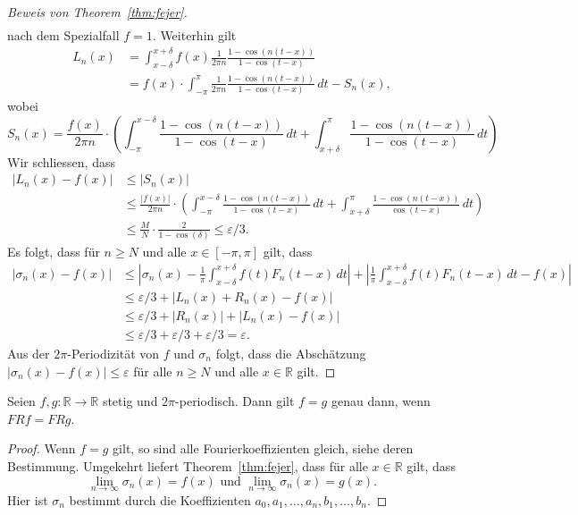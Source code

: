 \documentclass[../main.tex]{subfiles}
\begin{document}
\begin{proof}[Beweis von Theorem~\ref{thm:fejer}]
\begin{align*}
  \end{align*}
  nach dem Spezialfall $f = 1$.
  Weiterhin gilt
  \begin{align*}
    L_n(x) 
    &= \int_{x - \delta}^{x + \delta}f(x) \frac{1}{2 \pi n}
    \frac{1 - \cos(n(t-x))}{1 - \cos(t-x)}\\
    &= f(x) \cdot \int_{-\pi}^{\pi} \frac{1}{2 \pi n} \frac{1 - \cos(n(t-x))}{1 - \cos(t-x)} \, dt
    - S_n(x),
  \end{align*}
  wobei
  \[
    S_n(x) = \frac{f(x)}{2 \pi n}  \cdot
    \left(\int_{-\pi}^{x - \delta} \frac{1 - \cos(n(t-x))}{1 - \cos(t-x)} \, dt
    + \int_{x + \delta}^{\pi} \frac{1 - \cos(n(t-x))}{1 - \cos(t-x)} \, dt \right)
  \]
  Wir schliessen, dass
  \begin{align*}
    |L_n(x) - f(x)|
    & \leq |S_n(x)|\\
    & \leq \frac{|f(x)|}{2 \pi n} \cdot
    \left( 
      \int_{-\pi}^{x - \delta} \frac{1 - \cos(n(t-x))}{1 - \cos(t-x)} \, dt
      + \int_{x + \delta}^{\pi} \frac{1 - \cos(n(t-x))}{\cos(t-x)} \, dt
    \right)\\
    & \leq \frac{M}{N} \cdot \frac{2}{1 - \cos(\delta)} \leq \varepsilon/3.
  \end{align*}
  Es folgt, dass für $n \geq N$ und alle $x \in [-\pi, \pi]$ gilt, dass
  \begin{align*}
    |\sigma_n(x) - f(x)|
    &\leq
    \left| \sigma_n(x) - \frac{1}{\pi}
    \int_{x - \delta}^{x + \delta} f(t) F_n(t-x)  \, dt \right|
    + \left| \frac{1}{\pi}
    \int_{x - \delta}^{x + \delta} f(t) F_n(t-x) \, dt - f(x)\right|\\
    &\leq \varepsilon/3 + |L_n(x) + R_n(x) - f(x)|\\
    &\leq \varepsilon/3 + |R_n(x)| + |L_n(x) - f(x)| \\
    &\leq \varepsilon/3 + \varepsilon/3 + \varepsilon/3 = \varepsilon.
  \end{align*}
  Aus der $2\pi$-Periodizität von $f$ und $\sigma_n$ 
  folgt, dass die Abschätzung $|\sigma_n(x) - f(x)| \leq \varepsilon$ 
  für alle $n \geq N$ und alle $x \in \mathbb{R}$ gilt.
\end{proof}

\begin{corollary}
  Seien $f, g \colon\mathbb{R} \to \mathbb{R}$ stetig
  und $2 \pi $-periodisch.
  Dann gilt $f=g$ genau dann, wenn $FRf = FRg$.
\end{corollary}

\begin{proof}
  Wenn $f = g$ gilt, so sind alle Fourierkoeffizienten gleich,
  siehe deren Bestimmung.
  Umgekehrt liefert Theorem~\ref{thm:fejer}, dass für alle
  $x \in \mathbb{R}$ gilt, dass
  \[\lim_{n \to \infty} \sigma_n(x) = f(x) \text{ und }
  \lim_{n \to \infty} \sigma_n(x) = g(x).\]
  Hier ist $\sigma_n$ bestimmt durch die Koeffizienten
  $a_0, a_1, \dots, a_n, b_1, \dots, b_n$.
\end{proof}
\end{document}
